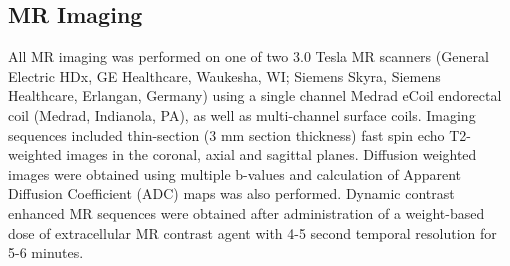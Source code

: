 \subsection{MR Imaging}
All MR imaging was performed on one of two 3.0 Tesla MR scanners (General
Electric HDx, GE Healthcare, Waukesha, WI;  Siemens Skyra, Siemens Healthcare,
Erlangan, Germany) using a single channel Medrad eCoil endorectal coil (Medrad,
Indianola, PA), as well as multi-channel surface coils.  Imaging sequences
included thin-section (3 mm section thickness) fast spin echo T2-weighted
images in the coronal, axial and sagittal planes.  Diffusion weighted images
were obtained using multiple b-values and calculation of Apparent Diffusion
Coefficient (ADC) maps was also performed.  Dynamic contrast enhanced MR
sequences were obtained after administration of a weight-based dose of
extracellular MR contrast agent with 4-5 second temporal resolution for 5-6
minutes.

